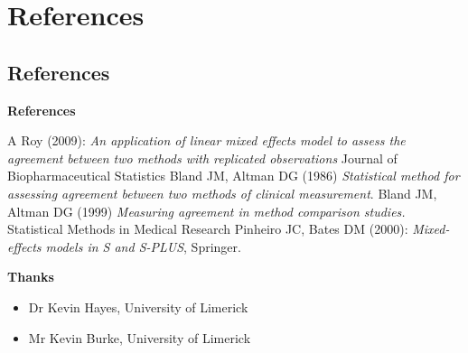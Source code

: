 \documentclass[compress]{beamer}        %
\makeatletter
\newcommand{\tcb}{\textcolor{beamer@blendedblue}}
\makeatother
\begin{document}
\section*[References]{References}
\subsection{References}
\begin{frame}{\bf \tcb{References}}
\begin{thebibliography}{99}
 A Roy (2009): \emph{An application of linear mixed effects model to assess the agreement between two methods with replicated observations} Journal of Biopharmaceutical Statistics
 Bland JM, Altman DG (1986) \emph{Statistical method for assessing agreement between two methods of clinical measurement}.
 Bland JM, Altman DG (1999)  \emph{Measuring agreement in method comparison studies.} Statistical Methods in Medical Research
 Pinheiro JC, Bates DM (2000): \emph{Mixed-effects models in S and S-PLUS},
Springer.
\end{thebibliography}
\end{frame}

\begin{frame}{\bf \tcb{Thanks}}
\begin{itemize}
\item Dr Kevin Hayes, University of Limerick
\item Mr Kevin Burke, University of Limerick
\end{itemize}
\end{frame}
\end{document}
